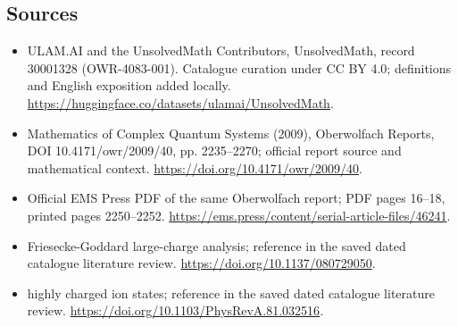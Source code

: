 \documentclass[11pt]{article}
\begin{document}
\subsection{Sources}
\begin{itemize}
\item[\hypertarget{source:30001328:1}{S1}] ULAM.AI and the UnsolvedMath Contributors, UnsolvedMath, record 30001328 (OWR-4083-001). Catalogue curation under CC BY 4.0; definitions and English exposition added locally.
\url{https://huggingface.co/datasets/ulamai/UnsolvedMath}.
\item[\hypertarget{source:30001328:2}{S2}] Mathematics of Complex Quantum Systems (2009), Oberwolfach Reports, DOI 10.4171/owr/2009/40, pp. 2235--2270; official report source and mathematical context.
\url{https://doi.org/10.4171/owr/2009/40}.
\item[\hypertarget{source:30001328:3}{S3}] Official EMS Press PDF of the same Oberwolfach report; PDF pages 16--18, printed pages 2250--2252.
\url{https://ems.press/content/serial-article-files/46241}.
\item[\hypertarget{source:30001328:4}{S4}] Friesecke-Goddard large-charge analysis; reference in the saved dated catalogue literature review.
\url{https://doi.org/10.1137/080729050}.
\item[\hypertarget{source:30001328:5}{S5}] highly charged ion states; reference in the saved dated catalogue literature review.
\url{https://doi.org/10.1103/PhysRevA.81.032516}.
\end{itemize}
\label{end:30001328}
\end{document}

